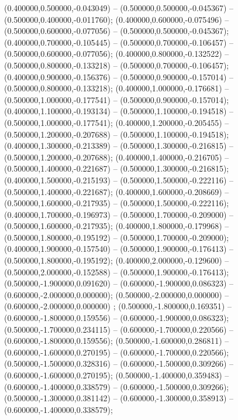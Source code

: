  (0.400000,0.500000,-0.043049) -- (0.500000,0.500000,-0.045367) -- (0.500000,0.400000,-0.011760);
 (0.400000,0.600000,-0.075496) -- (0.500000,0.600000,-0.077056) -- (0.500000,0.500000,-0.045367);
 (0.400000,0.700000,-0.105445) -- (0.500000,0.700000,-0.106457) -- (0.500000,0.600000,-0.077056);
 (0.400000,0.800000,-0.132522) -- (0.500000,0.800000,-0.133218) -- (0.500000,0.700000,-0.106457);
 (0.400000,0.900000,-0.156376) -- (0.500000,0.900000,-0.157014) -- (0.500000,0.800000,-0.133218);
 (0.400000,1.000000,-0.176681) -- (0.500000,1.000000,-0.177541) -- (0.500000,0.900000,-0.157014);
 (0.400000,1.100000,-0.193134) -- (0.500000,1.100000,-0.194518) -- (0.500000,1.000000,-0.177541);
 (0.400000,1.200000,-0.205455) -- (0.500000,1.200000,-0.207688) -- (0.500000,1.100000,-0.194518);
 (0.400000,1.300000,-0.213389) -- (0.500000,1.300000,-0.216815) -- (0.500000,1.200000,-0.207688);
 (0.400000,1.400000,-0.216705) -- (0.500000,1.400000,-0.221687) -- (0.500000,1.300000,-0.216815);
 (0.400000,1.500000,-0.215193) -- (0.500000,1.500000,-0.222116) -- (0.500000,1.400000,-0.221687);
 (0.400000,1.600000,-0.208669) -- (0.500000,1.600000,-0.217935) -- (0.500000,1.500000,-0.222116);
 (0.400000,1.700000,-0.196973) -- (0.500000,1.700000,-0.209000) -- (0.500000,1.600000,-0.217935);
 (0.400000,1.800000,-0.179968) -- (0.500000,1.800000,-0.195192) -- (0.500000,1.700000,-0.209000);
 (0.400000,1.900000,-0.157540) -- (0.500000,1.900000,-0.176413) -- (0.500000,1.800000,-0.195192);
 (0.400000,2.000000,-0.129600) -- (0.500000,2.000000,-0.152588) -- (0.500000,1.900000,-0.176413);
 (0.500000,-1.900000,0.091620) -- (0.600000,-1.900000,0.086323) -- (0.600000,-2.000000,0.000000);
 (0.500000,-2.000000,0.000000) -- (0.600000,-2.000000,0.000000) ;
 (0.500000,-1.800000,0.169351) -- (0.600000,-1.800000,0.159556) -- (0.600000,-1.900000,0.086323);
 (0.500000,-1.700000,0.234115) -- (0.600000,-1.700000,0.220566) -- (0.600000,-1.800000,0.159556);
 (0.500000,-1.600000,0.286811) -- (0.600000,-1.600000,0.270195) -- (0.600000,-1.700000,0.220566);
 (0.500000,-1.500000,0.328316) -- (0.600000,-1.500000,0.309266) -- (0.600000,-1.600000,0.270195);
 (0.500000,-1.400000,0.359483) -- (0.600000,-1.400000,0.338579) -- (0.600000,-1.500000,0.309266);
 (0.500000,-1.300000,0.381142) -- (0.600000,-1.300000,0.358913) -- (0.600000,-1.400000,0.338579);
